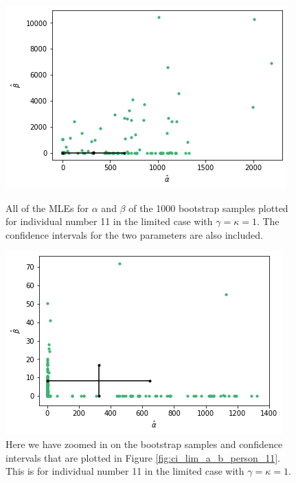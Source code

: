 \begin{figure}
    \centering
    \begin{minipage}{0.48\textwidth}
        \centering
        \includegraphics[scale=0.37]{pictures/ci_lim_a_b_person11.png}
        \caption[MLEs for $\alpha$ and $\beta$ for bootstrap samples individual 11, limited]{All of the MLEs for $\alpha$ and $\beta$ of the 1000 bootstrap samples plotted for individual number 11 in the limited case with $\gamma=\kappa=1$. The confidence intervals for the two parameters are also included.}
        \label{fig:ci_lim_a_b_person_11}
    \end{minipage}\hfill
    \begin{minipage}{0.48\textwidth}
        \centering
        \includegraphics[scale=0.37]{pictures/ci_lim_a_b_person11_zoomed.png}
        \caption[MLEs for $\alpha$ and $\beta$ of bootstrap samples individual 11, unlimited, zoomed]{Here we have zoomed in on the bootstrap samples and confidence intervals that are plotted in Figure \ref{fig:ci_lim_a_b_person_11}. This is for individual number 11 in the limited case with $\gamma=\kappa=1$.}
        \label{fig:ci_lim_a_b_person_11_zoomed}
    \end{minipage}
\end{figure}

